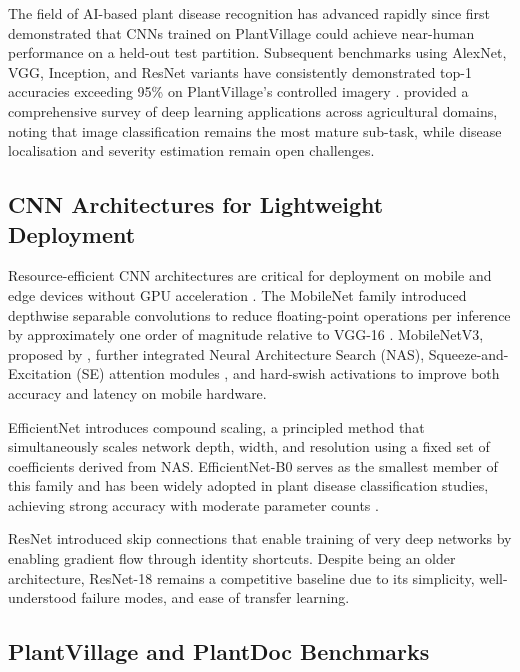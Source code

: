 \documentclass[pdflatex,sn-mathphys-num]{sn-jnl}
\theoremstyle{thmstyleone}%
\theoremstyle{thmstyletwo}%
\theoremstyle{thmstylethree}%
\begin{document}
The field of AI-based plant disease recognition has advanced rapidly since
\citet{mohanty2016} first demonstrated that CNNs trained on PlantVillage could
achieve near-human performance on a held-out test partition. Subsequent benchmarks
using AlexNet, VGG, Inception, and ResNet variants have consistently demonstrated
top-1 accuracies exceeding 95\% on PlantVillage's controlled imagery
\citep{ferentinos2018deep,too2019comparative}. \citet{kamilaris2018deep} provided
a comprehensive survey of deep learning applications across agricultural domains,
noting that image classification remains the most mature sub-task, while disease
localisation and severity estimation remain open challenges.

\subsection{CNN Architectures for Lightweight Deployment}

Resource-efficient CNN architectures are critical for deployment on mobile and
edge devices without GPU acceleration \citep{howard2017mobilenets}. The MobileNet
family introduced depthwise separable convolutions to reduce floating-point operations
per inference by approximately one order of magnitude relative to VGG-16
\citep{howard2017mobilenets}. MobileNetV3, proposed by \citet{howard2019mobilenetv3},
further integrated Neural Architecture Search (NAS), Squeeze-and-Excitation (SE)
attention modules \citep{hu2018squeeze}, and hard-swish activations to improve both
accuracy and latency on mobile hardware.

EfficientNet \citep{tan2019efficientnet} introduces compound scaling, a principled
method that simultaneously scales network depth, width, and resolution using a fixed
set of coefficients derived from NAS. EfficientNet-B0 serves as the smallest member
of this family and has been widely adopted in plant disease classification studies,
achieving strong accuracy with moderate parameter counts \citep{atila2021plant}.

ResNet \citep{he2016resnet} introduced skip connections that enable training of very
deep networks by enabling gradient flow through identity shortcuts. Despite being an
older architecture, ResNet-18 remains a competitive baseline due to its simplicity,
well-understood failure modes, and ease of transfer learning.

\subsection{PlantVillage and PlantDoc Benchmarks}
\end{document}
